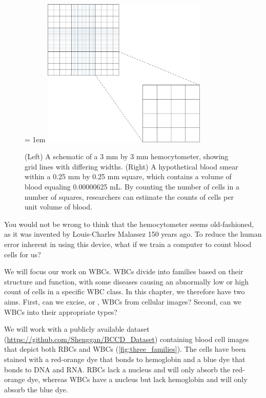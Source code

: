 \begin{figure}[h]
\centering
\tabcolsep = 1em
\mySfFamily
\includegraphics[width = 0.7\textwidth]{../images/hemocytometer.png}
\caption{(Left) A schematic of a 3 mm by 3 mm hemocytometer, showing grid lines with differing widths. (Right) A hypothetical blood smear within a 0.25 mm by 0.25 mm square, which contains a volume of blood equaling 0.00000625 mL. By counting the number of cells in a number of squares, researchers can estimate the counts of cells per unit volume of blood.}
\label{fig:hemocytometer}
\end{figure}

\begin{qbox}\end{qbox}

You would not be wrong to think that the hemocytometer seems old-fashioned, as it was invented by Louis-Charles Malassez 150 years ago. To reduce the human error inherent in using this device, what if we train a computer to count blood cells for us?

We will focus our work on WBCs. WBCs divide into families based on their structure and function, with some diseases causing an abnormally low or high count of cells in a specific WBC class. In this chapter, we therefore have two aims. First, can we excise, or , WBCs from cellular images?  Second, can we  WBCs into their appropriate types?

We will work with a publicly available dataset (\url{https://github.com/Shenggan/BCCD_Dataset}) containing blood cell images that depict both RBCs and WBCs (\autoref{fig:three_families}). The cells have been stained with a red-orange dye that bonds to hemoglobin and a blue dye that bonds to DNA and RNA. RBCs lack a nucleus and will only absorb the red-orange dye, whereas WBCs have a nucleus but lack hemoglobin and will only absorb the blue dye.

